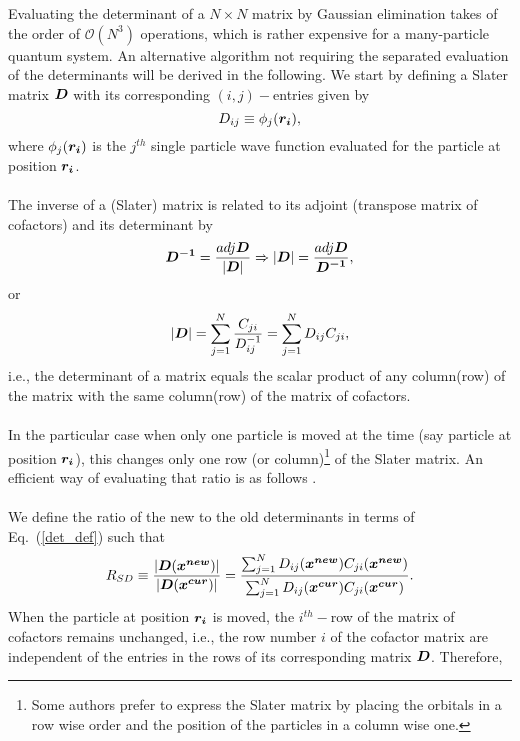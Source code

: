Evaluating the determinant of a $N \times N$ matrix by Gaussian elimination takes of the order of $\mathcal{O}(N^3)$ operations, which is rather expensive for a many-particle quantum system. An alternative algorithm not 
requiring the separated evaluation of the determinants will be derived in the following. We start by defining a Slater matrix $\boldsymbol{D} $ with its corresponding $(i,j)-$entries given by 
\begin{equation}\label{indexform_SM}
 D_{ij} \equiv \phi_j(\boldsymbol{r_i}),
\end{equation}
where $\phi_j(\boldsymbol{r_i})$ is the $j^{th}$ single particle wave function evaluated for the particle at position $\boldsymbol{r_i}$.\\
\\
\noindent
The inverse of a (Slater) matrix is related to its adjoint (transpose matrix of cofactors) and its determinant by
\begin{equation}\label{inverseDef}
\boldsymbol{D^{-1}} = \frac{adj{\boldsymbol{D}}}{{|\boldsymbol{D}|}} \Rightarrow {|\boldsymbol{D}|} = \frac{adj{\boldsymbol{D}}}{\boldsymbol{D^{-1}}}, 
\end{equation}
or
\begin{equation}\label{det_def}
 {|\boldsymbol{D}|} = \sum_{j=1}^{N}\frac{C_{ji}}{D^{-1}_{ij}} = \sum_{j=1}^{N}D_{ij} C_{ji},
\end{equation}
i.e., the determinant of a matrix equals the scalar product of any column(row) of the matrix with the same column(row) of the matrix of cofactors.\\
\\
\noindent
In the particular case when only one particle is moved at the time (say particle at position $\boldsymbol{r_i}$), this changes only one row (or column)\footnote{Some authors prefer to express the Slater matrix by placing the orbitals in a row wise order and the position of the particles in a column wise one.} of the Slater matrix. An efficient way of evaluating that ratio is as follows \cite{Ceperley_Chester,Hammond}.\\
\\
\noindent
We define the ratio of the new to the old determinants in terms of Eq.~(\ref{det_def}) such that
$$R_{SD} \equiv \frac{|\boldsymbol{D}(\boldsymbol{x^{new}})|}{|\boldsymbol{D}(\boldsymbol{x^{cur}})|} = \frac{\sum_{j=1}^{N}D_{ij}(\boldsymbol{x^{new}}) C_{ji}(\boldsymbol{x^{new}})}{\sum_{j=1}^{N}D_{ij}(\boldsymbol{x^{cur}}) C_{ji}(\boldsymbol{x^{cur}})}.
$$
When the particle at position $\boldsymbol{r_i}$ is moved, the $i^{th}-$row of the matrix of cofactors remains unchanged, i.e., the row number $i$ of the cofactor matrix are independent of the entries in the rows of its corresponding matrix $\boldsymbol{D}$. Therefore, 
